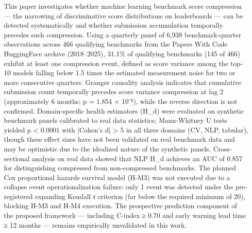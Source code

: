 
This paper investigates whether machine learning benchmark score compression — the narrowing of discriminative score distributions on leaderboards — can be detected systematically and whether submission accumulation temporally precedes such compression. Using a quarterly panel of 6,938 benchmark-quarter observations across 466 qualifying benchmarks from the Papers With Code HuggingFace archive (2018–2025), 31.1\% of qualifying benchmarks (145 of 466) exhibit at least one compression event, defined as score variance among the top-10 models falling below 1.5 times the estimated measurement noise for two or more consecutive quarters. Granger causality analysis indicates that cumulative submission count temporally precedes score variance compression at lag 2 (approximately 6 months; p = 1.854 × 10⁻⁵), while the reverse direction is not confirmed. Domain-specific health estimators (H_d) were evaluated on synthetic benchmark panels calibrated to real data statistics; Mann-Whitney U tests yielded p < 0.0001 with |Cohen's d| > 5 in all three domains (CV, NLP, tabular), though these effect sizes have not been validated on real benchmark data and may be optimistic due to the idealized nature of the synthetic panels. Cross-sectional analysis on real data showed that NLP H_d achieves an AUC of 0.857 for distinguishing compressed from non-compressed benchmarks. The planned Cox proportional hazards survival model (H-M3) was not executed due to a collapse event operationalization failure: only 1 event was detected under the pre-registered expanding Kendall τ criterion (far below the required minimum of 20), blocking H-M3 and H-M4 execution. The prospective prediction component of the proposed framework — including C-index ≥ 0.70 and early warning lead time ≥ 12 months — remains empirically unvalidated in this work.

